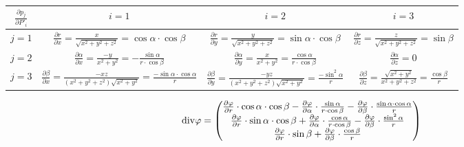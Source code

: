 \begin{tabular}{| c || c | c | c |}
\hline
\(\frac{\partial p_j}{\partial P'_i}\) & \(i=1\) & \(i=2\) & \(i=3\)\\
\hline
\hline
\(j=1\) & \(\frac{\partial r}{\partial x} = \frac{x}{\sqrt{x^2 + y^2 + z^2}} = \cos \alpha \cdot \cos \beta\) & \(\frac{\partial r}{\partial y} = \frac{y}{\sqrt{x^2 + y^2 + z^2}} = \sin \alpha \cdot \cos \beta\) & \(\frac{\partial r}{\partial z} = \frac{z}{\sqrt{x^2 + y^2 + z^2}} = \sin \beta\)\\
\hline
\(j=2\) & \(\frac{\partial \alpha}{\partial x} = \frac{-y}{x^2 + y^2} = -\frac{\sin \alpha}{r \cdot \cos \beta}\) & \(\frac{\partial \alpha}{\partial y} = \frac{x}{x^2 + y^2} = \frac{\cos \alpha}{r \cdot \cos \beta}\) & \(\frac{\partial \alpha}{\partial z} = 0\)\\
\hline
\(j=3\) & \(\frac{\partial \beta}{\partial x} = \frac{-xz}{(x^2 + y^2 + z^2) \sqrt{x^2 + y^2}} = \frac{-\sin \alpha \cdot \cos \alpha}{r}\) & \(\frac{\partial \beta}{\partial y} = \frac{-yz}{(x^2 + y^2 + z^2) \sqrt{x^2 + y^2}} = \frac{-\sin^2 \alpha}{r}\) & \(\frac{\partial \beta}{\partial z} = \frac{\sqrt{x^2 + y^2}}{x^2 + y^2 + z^2} = \frac{\cos \beta}{r}\)\\
\hline
\end{tabular}

\begin{equation}
\mathrm{div}{\varphi} = \begin{pmatrix}
\frac{\partial \varphi}{\partial r} \cdot \cos \alpha \cdot \cos \beta - \frac{\partial \varphi}{\partial \alpha} \cdot \frac{\sin \alpha}{r \cdot \cos \beta} - \frac{\partial \varphi}{\partial \beta} \cdot \frac{\sin \alpha \cdot \cos \alpha}{r} \\
\frac{\partial \varphi}{\partial r} \cdot \sin \alpha \cdot \cos \beta + \frac{\partial \varphi}{\partial \alpha} \cdot \frac{\cos \alpha}{r \cdot \cos \beta} - \frac{\partial \varphi}{\partial \beta} \cdot \frac{\sin^2 \alpha}{r} \\
\frac{\partial \varphi}{\partial r} \cdot \sin \beta + \frac{\partial \varphi}{\partial \beta} \cdot \frac{\cos \beta}{r} \\
\end{pmatrix}
\end{equation}
